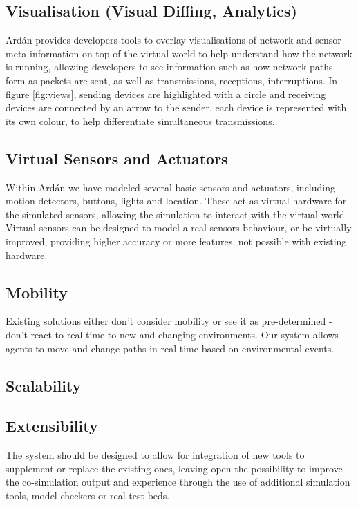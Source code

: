 \subsection{Visualisation (Visual Diffing, Analytics)}
\label{sub:Visualisation}
Ard\'{a}n provides developers tools to overlay visualisations of network and sensor meta-information on top of the virtual world to help understand how the network is running, allowing developers to see information such as how network paths form as packets are sent, as well as transmissions, receptions, interruptions. In figure \ref{fig:views}, sending devices are highlighted with a circle and receiving devices are connected by an arrow to the sender, each device is represented with its own colour, to help differentiate simultaneous transmissions.

\subsection{Virtual Sensors and Actuators}
\label{sub:Virtual Sensors and Actuators}
Within Ard\'{a}n we have modeled several basic sensors and actuators, including motion detectors, buttons, lights and location. These act as virtual hardware for the simulated sensors, allowing the simulation to interact with the virtual world. Virtual sensors can be designed to model a real sensors behaviour, or be virtually improved, providing higher accuracy or more features, not possible with existing hardware.

\subsection{Mobility} %
\label{sub:mobility}
Existing solutions either don't consider mobility or see it as pre-determined - don't react to real-time to new and changing environments.
Our system allows agents to move and change paths in real-time based on environmental events.

\subsection{Scalability} %
\label{sub:scalability}


\subsection{Extensibility} %
\label{sub:extensibility}
The system should be designed to allow for integration of new tools to supplement or replace the existing ones, leaving open the possibility to improve the co-simulation output and experience through the use of additional simulation tools, model checkers or real test-beds.

